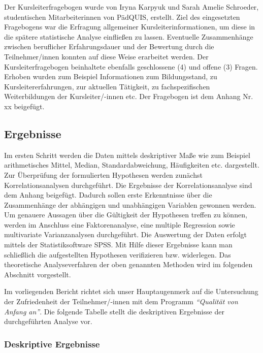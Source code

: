 \documentclass[12pt,a4paper]{article}
\begin{document}
Der Kursleiterfragebogen wurde von Iryna Karpyuk und Sarah Amelie Schroeder, studentischen Mitarbeiterinnen von PädQUIS, erstellt. Ziel des eingesetzten Fragebogens war die Erfragung allgemeiner Kursleiterinformationen, um diese in die spätere statistische Analyse einfließen zu lassen. Eventuelle Zusammenhänge zwischen beruflicher Erfahrungsdauer und der Bewertung durch die Teilnehmer/innen konnten auf diese Weise erarbeitet werden. Der Kursleiterfragebogen beinhaltete ebenfalls geschlossene (4) und offene (3) Fragen. Erhoben wurden zum Beispiel Informationen zum Bildungsstand, zu Kursleitererfahrungen, zur aktuellen Tätigkeit, zu fachspezifischen Weiterbildungen der Kursleiter/-innen etc. Der Fragebogen ist dem Anhang Nr. xx beigefügt.

\subsection{Ergebnisse}

Im ersten Schritt werden die Daten mittels deskriptiver Maße wie zum Beispiel arithmetisches Mittel, Median, Standardabweichung, Häufigkeiten etc. dar\-ge\-stellt. Zur Überprüfung der formulierten Hypothesen werden zunächst Korrelationsanalysen durchgeführt. Die Ergebnisse der Korrelationsanalyse sind dem Anhang beigefügt. Dadurch sollen erste Erkenntnisse über die Zusammenhänge der abhängigen und unabhängigen Variablen gewonnen werden. Um genauere Aussagen über die Gültigkeit der Hypothesen treffen zu können, werden im Anschluss eine Faktorenanalyse, eine multiple Regression sowie multivariate Varianzanalysen durchgeführt. Die Auswertung der Daten erfolgt mittels der Statistiksoftware SPSS. Mit Hilfe dieser Ergebnisse kann man schließlich die aufgestellten Hypothesen verifizieren bzw. widerlegen. Das theoretische Analyseverfahren der oben genannten Methoden wird im folgenden Abschnitt vorgestellt. 

Im vorliegenden Bericht richtet sich unser Hauptaugenmerk auf die Untersuchung der Zufriedenheit der Teilnehmer/-innen mit dem Programm \textit{"`Qualität von Anfang an"'}. Die folgende Tabelle stellt die deskriptiven Ergebnisse der durchgeführten Analyse vor. 

\subsubsection{Deskriptive Ergebnisse}
\end{document}
